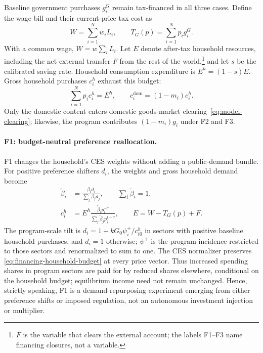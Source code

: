 Baseline government purchases $g_i^G$ remain tax-financed in all three
cases. Define the wage bill and their current-price tax cost as
\begin{equation}
W = \sum_{i=1}^N w_i L_i,
\qquad T_G(p) = \sum_{i=1}^N p_i g_i^G.
\label{eq:financing-baseline-budget}
\end{equation}
With a common wage, $W = w\sum_i L_i$. Let $E$ denote after-tax household
resources, including the net external transfer $F$ from the rest of the
world,\footnote{$F$ is the variable that clears the external account; the
labels F1--F3 name financing closures, not a variable.} and let $s$ be the
calibrated saving rate. Household consumption expenditure is
$E^h = (1-s)E$. Gross household purchases $c_i^h$ exhaust this budget:
\begin{equation}
\sum_{i=1}^N p_i c_i^h = E^h,
\qquad c_i^{\mathrm{dom}} = (1-m_i)c_i^h.
\label{eq:financing-household-budget}
\end{equation}
Only the domestic content enters domestic goods-market
clearing~\eqref{eq:model-clearing}; likewise, the program contributes
$(1-m_i)g_i$ under F2 and F3.

\paragraph{F1: budget-neutral preference reallocation.}
F1 changes the household's CES weights without adding a public-demand
bundle. For positive preference shifters $d_i$, the weights and gross
household demand become
\begin{align}
\widetilde{\beta}_i
 &= \frac{\beta_i d_i}{\sum_j\beta_j d_j},
\qquad \sum_i\widetilde{\beta}_i = 1,
\label{eq:closure-f1-weights}\\
c_i^h
 &= E^h\frac{\widetilde{\beta}_i p_i^{-\sigma}}
 {\sum_j\widetilde{\beta}_j p_j^{1-\sigma}},
\qquad E = W-T_G(p)+F.
\label{eq:closure-f1}
\end{align}
The program-scale tilt is $d_i = 1+kG_0\psi_i^+/c_{i0}^h$ in sectors
with positive baseline household purchases, and $d_i=1$ otherwise;
$\psi^+$ is the program incidence restricted to those sectors and
renormalized to sum to one. The CES normalizer preserves
\eqref{eq:financing-household-budget} at every price vector. Thus increased
spending shares in program sectors are paid for by reduced shares
elsewhere, conditional on the household budget; equilibrium income need
not remain unchanged. Hence, strictly speaking, F1 is a demand-repurposing experiment emerging from either preference shifts or imposed regulation, not an autonomous investment injection or multiplier.

